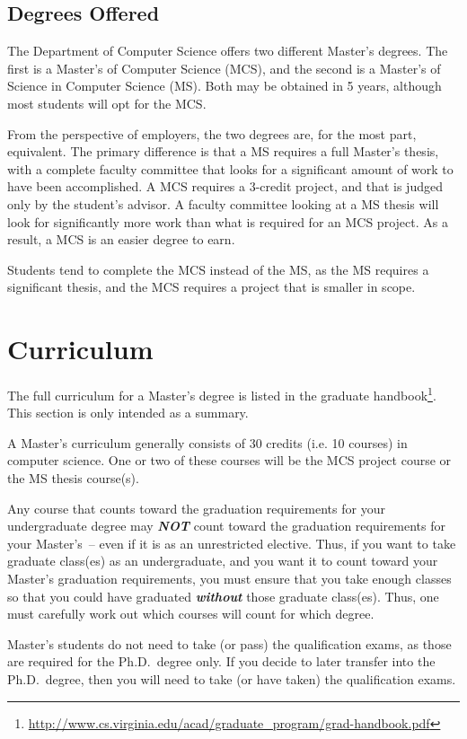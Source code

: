 \documentclass[10pt,letter,twocolumn]{book}
\newcommand{\mysection}[1]{\section{#1}\renewcommand{\rightmark}{#1}}
\newcommand{\myurl}[1]{\footnote{\scriptsize\url{#1}}}
\begin{document}
\subsection{Degrees Offered}

The Department of Computer Science offers two different Master's
degrees.  The first is a Master's of Computer Science (MCS), and the
second is a Master's of Science in Computer Science (MS).  Both may be
obtained in 5 years, although most students will opt for the MCS.

From the perspective of employers, the two degrees are, for the most part,
equivalent.  The primary difference is that a MS requires a full
Master's thesis, with a complete faculty committee that looks for a
significant amount of work to have been accomplished.  A MCS requires a
3-credit project, and that is judged only by the student's advisor.  A
faculty committee looking at a MS thesis will look for significantly
more work than what is required for an MCS project.  As a result, a
MCS is an easier degree to earn.

Students tend to complete the MCS instead of the MS, as the MS
requires a significant thesis, and the MCS requires a project that is
smaller in scope.


\mysection{Curriculum}

The full curriculum for a Master's degree is listed in the graduate
handbook\myurl{http://www.cs.virginia.edu/acad/graduate_program/grad-handbook.pdf}.
This section is only intended as a summary.

A Master's curriculum generally consists of 30 credits (i.e. 10
courses) in computer science.  One or two of these courses will be the
MCS project course or the MS thesis course(s).

Any course that counts toward the graduation requirements for your
undergraduate degree may {\em\bf NOT} count toward the graduation
requirements for your Master's~-- even if it is as an unrestricted
elective.  Thus, if you want to take graduate class(es) as an
undergraduate, and you want it to count toward your Master's
graduation requirements, you must ensure that you take enough classes
so that you could have graduated {\em\bf without} those graduate
class(es).  Thus, one must carefully work out which courses will count
for which degree.

Master's students do not need to take (or pass) the qualification
exams, as those are required for the Ph.D.\ degree only.  If you
decide to later transfer into the Ph.D.\ degree, then you will need to
take (or have taken) the qualification exams.
\end{document}
